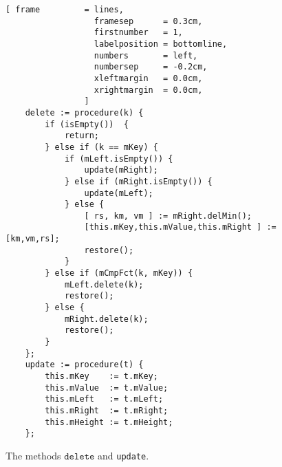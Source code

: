 \begin{figure}[!ht]
\centering
\begin{Verbatim}[ frame         = lines, 
                  framesep      = 0.3cm, 
                  firstnumber   = 1,
                  labelposition = bottomline,
                  numbers       = left,
                  numbersep     = -0.2cm,
                  xleftmargin   = 0.0cm,
                  xrightmargin  = 0.0cm,
                ]
    delete := procedure(k) {
        if (isEmpty())  { 
            return; 
        } else if (k == mKey) {
            if (mLeft.isEmpty()) {
                update(mRight);
            } else if (mRight.isEmpty()) {
                update(mLeft);
            } else {
                [ rs, km, vm ] := mRight.delMin();
                [this.mKey,this.mValue,this.mRight ] := [km,vm,rs];
                restore();
            }
        } else if (mCmpFct(k, mKey)) {
            mLeft.delete(k);
            restore();
        } else {
            mRight.delete(k);
            restore();
        }
    };
    update := procedure(t) {
        this.mKey    := t.mKey;
        this.mValue  := t.mValue;
        this.mLeft   := t.mLeft;
        this.mRight  := t.mRight;
        this.mHeight := t.mHeight;
    };
\end{Verbatim}
\vspace*{-0.3cm}
\caption{The methods $\mathtt{delete}$ and \texttt{update}.}
\label{fig:avl-tree.stlx:delete}
\end{figure}
